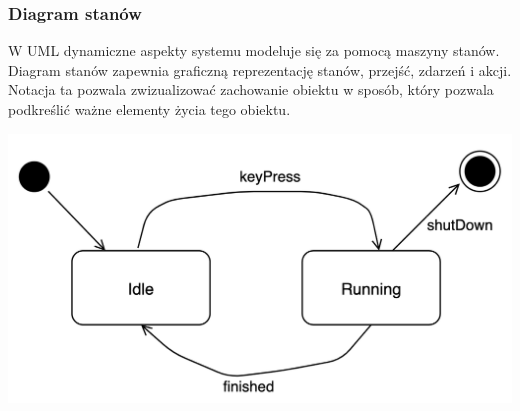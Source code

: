 \documentclass[12pt]{article}
\begin{document}
            \subsubsection{Diagram stanów}

                W UML dynamiczne aspekty systemu modeluje się za pomocą maszyny stanów.
                Diagram stanów zapewnia graficzną reprezentację stanów, przejść, zdarzeń i akcji.
                Notacja ta pozwala zwizualizować zachowanie obiektu w sposób, który pozwala
                podkreślić ważne elementy życia tego obiektu.

                    \begin{center}
                        \includegraphics[scale=0.40]{state-diagram/diagram.png}
                    \end{center}
\end{document}
